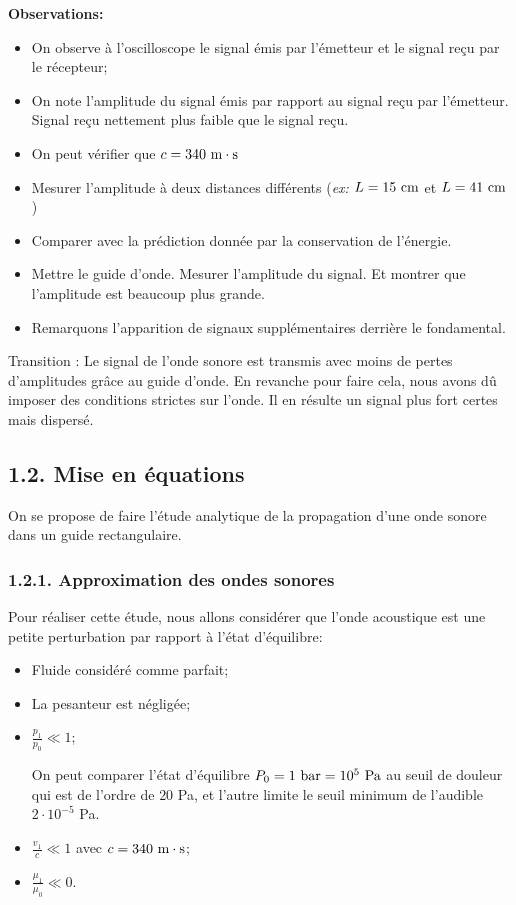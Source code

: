 \documentclass[french, a4paper, 10pt, twocolumn, landscape]{article}
\begin{document}
\textbf{Observations:}
\begin{itemize}
	\item On observe à l'oscilloscope le signal émis par l'émetteur et le signal reçu par le récepteur;
	\item On note l'amplitude du signal émis par rapport au signal reçu par l'émetteur. Signal reçu nettement plus faible que le signal reçu.
	\item On peut vérifier que $c=340~\rm m\cdot s$
	\item Mesurer l'amplitude à deux distances différents (\textit{ex:} $L = 15~\rm cm$ et $L=41~\rm cm$)
	\item Comparer avec la prédiction donnée par la conservation de l'énergie.
	\item Mettre le guide d'onde. Mesurer l'amplitude du signal. Et montrer que l'amplitude est beaucoup plus grande. 
	\item Remarquons l'apparition de signaux supplémentaires derrière le fondamental.
\end{itemize} 

Transition : Le signal de l'onde sonore est transmis avec moins de pertes d'amplitudes grâce au guide d'onde. En revanche pour faire cela, nous avons dû imposer des conditions strictes sur l'onde. Il en résulte un signal plus fort certes mais dispersé.

\subsection*{1.2. Mise en équations}

On se propose de faire l'étude analytique de la propagation d'une onde sonore dans un guide rectangulaire.

\subsubsection*{1.2.1. Approximation des ondes sonores}
Pour réaliser cette étude, nous allons considérer que l'onde acoustique est une petite perturbation par rapport à l'état d'équilibre:
\begin{itemize}
	\item Fluide considéré comme parfait;
	\item La pesanteur est négligée;
	\item $\frac{p_1}{p_0}\ll 1$;

\noindent On peut comparer l'état d'équilibre $P_0= 1~\rm bar = 10^5~\rm Pa$ au seuil de douleur qui est de l'ordre de $20$ Pa, et l'autre limite le seuil minimum de l'audible $2\cdot 10^{-5}$ Pa.
	\item  $\frac{v_1}{c}\ll 1$ avec $c=340~\rm m\cdot s$;
	\item $\frac{\mu_1}{\mu_0}\ll 0$.
\end{itemize}
\end{document}
